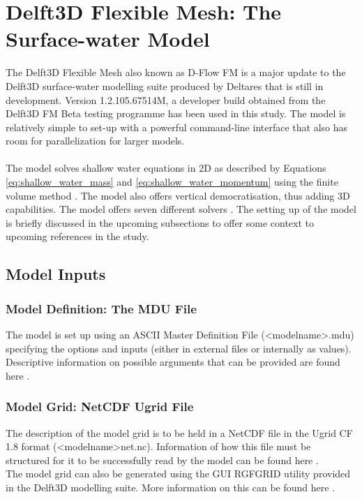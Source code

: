 \section{Delft3D Flexible Mesh: The Surface-water Model}
\label{delft}
The Delft3D Flexible Mesh also known as D-Flow FM is a major update to the Delft3D surface-water modelling suite produced by Deltares that is still in development. Version 1.2.105.67514M, a developer build obtained from the Delft3D FM Beta testing programme has been used in this study.
The model is relatively simple to set-up with a powerful command-line interface that also has room for parallelization for larger models.
\\ \\
The model solves shallow water equations in 2D as described by Equations \ref{eq:shallow_water_mass} and \ref{eq:shallow_water_momentum} using the finite volume method \cite{Deltares}. The model also offers vertical democratisation, thus adding 3D capabilities. The model offers seven different solvers \cite[p.~109]{Deltares2016}. The setting up of the model is briefly discussed in the upcoming subsections to offer some context to upcoming references in the study.

\subsection{Model Inputs}
\subsubsection*{Model Definition: The MDU File}
The model is set up using an ASCII Master Definition File (\textless model\textunderscore name\textgreater .mdu) specifying the options and inputs (either in external files or internally as values). Descriptive information on possible arguments that can be provided are found here \cite[p.~373]{Deltares2016}.

\subsubsection*{Model Grid: NetCDF Ugrid File}
The description of the model grid is to be held in a NetCDF file in the Ugrid CF 1.8 format (\textless model\textunderscore name\textgreater \textunderscore net.nc). Information of how this file must be structured for it to be successfully read by the model can be found here \cite[p.~383]{Deltares2016}.
\\
The model grid can also be generated using the GUI RGFGRID utility provided in the Delft3D modelling suite. More information on this can be found here \cite{Deltares2014}.

